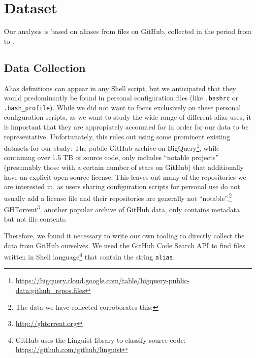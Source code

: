 \section{Dataset}

Our analysis is based on \TODO aliases from \TODO files on GitHub, collected in the period from \TODO to \TODO.


\subsection{Data Collection}

Alias definitions can appear in any Shell script, but we anticipated that they would predominantly be found in personal configuration files (like \verb|.bashrc| or \verb|.bash_profile|).
While we did not want to focus exclusively on these personal configuration scripts, as we want to study the wide range of different alias uses, it is important that they are appropiately accounted for in order for our data to be representative.
Unfortunately, this rules out using some prominent existing datasets for our study:
The public GitHub archive on BigQuery\footnote{\url{https://bigquery.cloud.google.com/table/bigquery-public-data:github_repos.files}}, while containing over 1.5 TB of source code, only includes ``notable projects'' (presumably those with a certain number of stars on GitHub) that additionally have an explicit open source license. 
This leaves out many of the repositories we are interested in, as users sharing configuration scripts for personal use do not usually add a license file and their repositories are generally not ``notable''.\footnote{The data we have collected corroborates this: \TODO}
GHTorrent\footnote{\url{http://ghtorrent.org}}, another popular archive of GitHub data, only contains metadata but not file contents.

Therefore, we found it necessary to write our own tooling to directly collect the data from GitHub ourselves.
We used the GitHub Code Search API to find files written in Shell language\footnote{GitHub uses the Linguist library to classify source code: \url{https://github.com/github/linguist}} that contain the string \verb|alias|.

